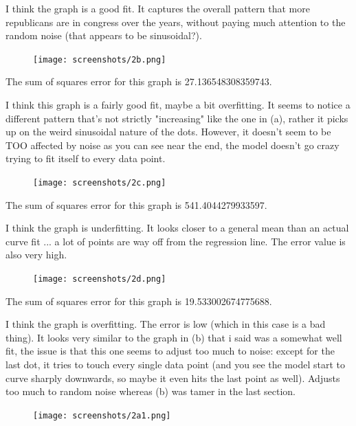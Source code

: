 \documentclass[submit]{harvardml}
\begin{document}
\bigskip \noindent I think the graph is a good fit. It captures the overall pattern that more republicans are in congress over the years, without paying much attention to the random noise (that appears to be sinusoidal?). 

\begin{figure}[h]
\centering
\texttt{[image: screenshots/2b.png]}
\end{figure}

\bigskip \noindent The sum of squares error for this graph is 27.136548308359743.

\bigskip \noindent I think this graph is a fairly good fit, maybe a bit overfitting. It seems to notice a different pattern that's not strictly "increasing" like the one in (a), rather it picks up on the weird sinusoidal nature of the dots. However, it doesn't seem to be TOO affected by noise as you can see near the end, the model doesn't go crazy trying to fit itself to every data point. 

\newpage

\begin{figure}[h]
\centering
\texttt{[image: screenshots/2c.png]}
\end{figure}

\bigskip \noindent The sum of squares error for this graph is 541.4044279933597.

\bigskip \noindent I think the graph is underfitting. It looks closer to a general mean than an actual curve fit ... a lot of points are way off from the regression line. The error value is also very high.

\begin{figure}[h]
\centering
\texttt{[image: screenshots/2d.png]}
\end{figure}

\bigskip \noindent The sum of squares error for this graph is 19.533002674775688.

\bigskip \noindent I think the graph is overfitting. The error is low (which in this case is a bad thing). It looks very similar to the graph in (b) that i said was a somewhat well fit, the issue is that this one seems to adjust too much to noise: except for the last dot, it tries to touch every single data point (and you see the model start to curve sharply downwards, so maybe it even hits the last point as well). Adjusts too much to random noise whereas (b) was tamer in the last section.

\newpage

\begin{figure}[h]
\centering
\texttt{[image: screenshots/2a1.png]}
\end{figure}
\end{document}
